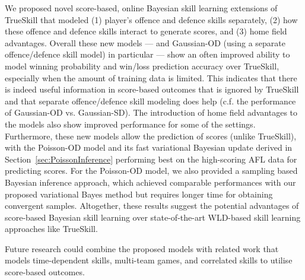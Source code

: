 We proposed novel score-based, online Bayesian skill learning extensions of
TrueSkill that modeled (1) player's offence and defence skills
separately, (2) how these offence and defence skills
interact to generate scores, and (3) home field advantages.  Overall these new models --- and
Gaussian-OD (using a separate offence/defence skill model) in particular ---
show an often improved ability to model winning probability and
win/loss prediction accuracy over TrueSkill, especially when the
amount of training data is limited. This indicates that there is
indeed useful information in score-based outcomes that is ignored by
TrueSkill and that separate offence/defence skill modeling does help
(c.f. the performance of Gaussian-OD vs. Gaussian-SD). The introduction of home field advantages to the models also show improved performance for some of the settings. Furthermore, these new models allow the prediction of scores (unlike TrueSkill),
with the Poisson-OD model and its fast variational Bayesian update derived
in Section~\ref{sec:PoissonInference} performing best on the
high-scoring AFL data for predicting scores. For the Poisson-OD model, we also provided a sampling based Bayesian inference approach, which achieved comparable performances with our proposed variational Bayes method but requires longer time for obtaining convergent samples. Altogether, these results suggest the
potential advantages of score-based Bayesian skill learning over
state-of-the-art WLD-based skill learning approaches like TrueSkill.

Future research could combine the proposed models with related work that models time-dependent skills, multi-team games, and correlated skills to utilise score-based outcomes.